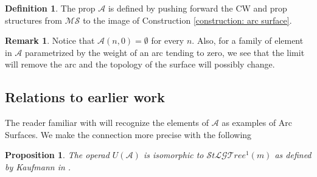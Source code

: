 \documentclass{amsart}
\newcommand{\MS}{\mathcal{MS}}
\renewcommand{\1}{\mathbf{1}}
\newtheorem{proposition}[theorem]{Proposition}
\theoremstyle{definition}
\newtheorem{definition}[theorem]{Definition}
\newtheorem{remark}[theorem]{Remark}
\begin{document}
\begin{definition}
	The prop $\mathcal{A}$ is defined by pushing forward the CW and prop structures from $\MS$ to the image of Construction \ref{construction: arc surface}.
\end{definition}

\begin{remark} \label{remark: what happends when the weight goes to 0}
	Notice that $\mathcal A(n,0) = \emptyset$ for every $n$. Also, for a family of element in $\mathcal A$ parametrized by the weight of an arc tending to zero, we see that the limit will remove the arc and the topology of the surface will possibly change.
\end{remark}

\subsection{Relations to earlier work}

The reader familiar with \cite{kaufmann03arc} will recognize the elements of $\mathcal A$ as examples of Arc Surfaces. We make the connection more precise with the following

\begin{proposition} \label{theorem: StLGThree and K are isomorphic}
	The operad $U(\mathcal{A})$ is isomorphic to $\mathcal{S}t\mathcal{LGT}ree^1(m)$ as defined by Kaufmann in \cite{kaufmann09dimension}.
\end{proposition}
\end{document}
